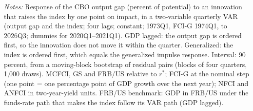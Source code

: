 \begin{table}[tbp]\centering\small
\caption{The Output Gap after a One-Point Move in Each Index}\label{tab:nvvar}
\begin{flushleft}\footnotesize\textit{Notes:} Response of the CBO output gap (percent of potential) to an innovation that raises the index by one point on impact, in a two-variable quarterly VAR (output gap and the index; four lags; constant; 1973Q1, FCI-G 1974Q1, to 2026Q3; dummies for 2020Q1--2021Q1). GDP lagged: the output gap is ordered first, so the innovation does not move it within the quarter. Generalized: the index is ordered first, which equals the generalized impulse response. Interval: 90 percent, from a moving-block bootstrap of residual pairs (blocks of four quarters, 1,000 draws). MCFCI, GS and FRB/US relative to $r^*$; FCI-G at the nominal step (one point = one percentage point of GDP growth over the next year); NFCI and ANFCI in two-year-yield units. FRB/US benchmark: GDP in FRB/US under the funds-rate path that makes the index follow its VAR path (GDP lagged).\end{flushleft}
\end{table}
